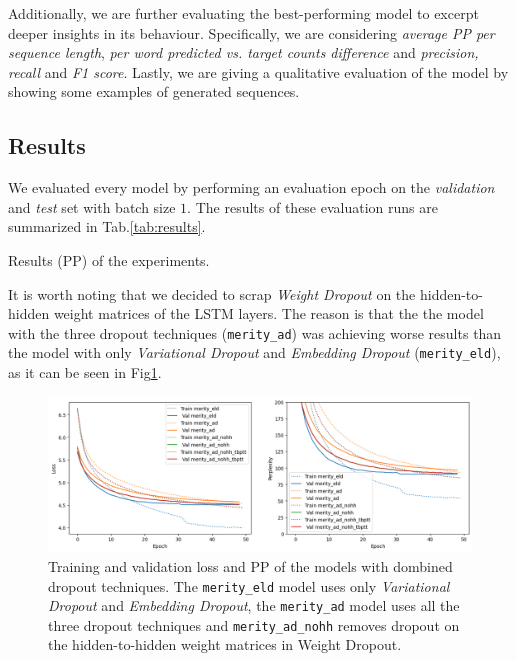 Additionally, we are further evaluating the best-performing model to excerpt deeper insights in its behaviour. Specifically, we are considering \emph{average PP per sequence length}, \emph{per word predicted vs. target counts difference} and \emph{precision, recall} and \emph{F1 score}. Lastly, we are giving a qualitative evaluation of the model by showing some examples of generated sequences.

\subsection{Results}
We evaluated every model by performing an evaluation epoch on the \emph{validation} and \emph{test} set with batch size $1$. The results of these evaluation runs are summarized in Tab.\ref{tab:results}.
\begin{table}
    
    \caption{Results (PP) of the experiments.}
    \label{tab:results}
\end{table}
It is worth noting that we decided to scrap \emph{Weight Dropout} on the hidden-to-hidden weight matrices of the LSTM layers. The reason is that the the model with the three dropout techniques (\texttt{merity\_ad}) was achieving worse results than the model with only \emph{Variational Dropout} and \emph{Embedding Dropout} (\texttt{merity\_eld}), as it can be seen in Fig\ref{fig:tl_merity_ads}.

\begin{figure}
    \centering
    \includegraphics[width=.5\textwidth]{./assets/images/tl_merity_ads}
    \caption{Training and validation loss  and PP of the models with dombined dropout techniques. The \texttt{merity\_eld} model uses only \emph{Variational Dropout} and \emph{Embedding Dropout}, the \texttt{merity\_ad} model uses all the three dropout techniques and \texttt{merity\_ad\_nohh} removes dropout on the hidden-to-hidden weight matrices in Weight Dropout.}
    \label{fig:tl_merity_ads}
\end{figure}


